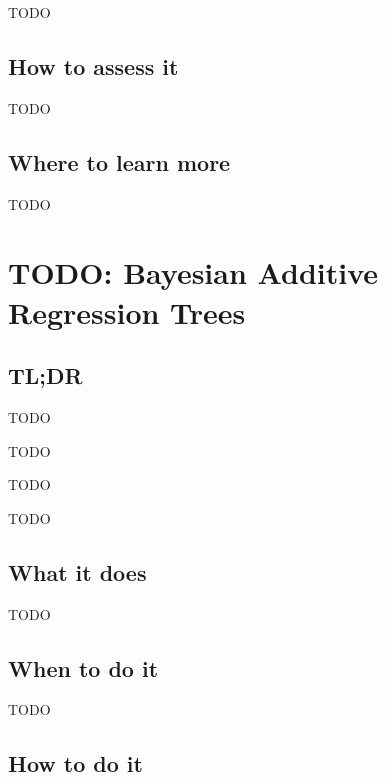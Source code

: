 \documentclass[
]{book}
\providecommand{\tightlist}{%
  \setlength{\itemsep}{0pt}\setlength{\parskip}{0pt}}
\begin{document}
TODO

\hypertarget{how-to-assess-it-18}{%
\section{How to assess it}\label{how-to-assess-it-18}}

TODO

\hypertarget{where-to-learn-more-18}{%
\section{Where to learn more}\label{where-to-learn-more-18}}

TODO

\hypertarget{bayesian-additive-regression-trees}{%
\chapter{TODO: Bayesian Additive Regression Trees}\label{bayesian-additive-regression-trees}}

\hypertarget{tldr-19}{%
\section{TL;DR}\label{tldr-19}}

\begin{description}
\tightlist
\item[What it does]
TODO
\item[When to do it]
TODO
\item[How to do it]
TODO
\item[How to assess it]
TODO
\end{description}

\hypertarget{what-it-does-19}{%
\section{What it does}\label{what-it-does-19}}

TODO

\hypertarget{when-to-do-it-19}{%
\section{When to do it}\label{when-to-do-it-19}}

TODO

\hypertarget{how-to-do-it-19}{%
\section{How to do it}\label{how-to-do-it-19}}
\end{document}
